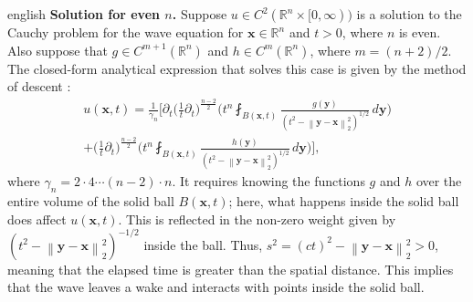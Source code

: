 \documentclass[12pt,letterpaper,twoside]{book}
\newcommand{\norm}[1]{\left\lVert #1 \right\rVert}
\begin{document}
\begin{hyphenrules}{english}
\textbf{Solution for even $n$.}
Suppose $u\in C^2(\mathbb{R}^n\times[0,\infty))$ is a solution to the Cauchy problem for the wave equation for
$\mathbf{x}\in\mathbb{R}^n$ and $t>0$, where $n$ is even. Also suppose that $g\in C^{m+1}(\mathbb{R}^n)$ and $h\in C^m(\mathbb{R}^n)$,
where $m=(n+2)/2$. The closed-form analytical expression that solves this case is given by the method
of descent \cite{evans2010}:
\begin{multline}
  u(\mathbf{x},t)=\frac{1}{\gamma_n}\Bigg[\partial_t\Big(\frac1t\partial_t\Big)^{\frac{n-2}{2}}
    \Big(t^{n}\fint_{B(\mathbf{x},t)}\frac{g(\mathbf{y})}{(t^2-\norm{\mathbf{y}-\mathbf{x}}_2^2)^{1/2}}\,d\mathbf{y}\Big)\\
    +\Big(\frac1t\partial_t\Big)^{\frac{n-2}{2}}
    \Big(t^{n}\fint_{B(\mathbf{x},t)}\frac{h(\mathbf{y})}{(t^2-\norm{\mathbf{y}-\mathbf{x}}_2^2)^{1/2}}\,d\mathbf{y}\Big)\Bigg],
  \label{eq:wave-even}
\end{multline}
where $\gamma_n=2\cdot4\cdots(n-2)\cdot n$. It requires knowing the functions $g$ and $h$ over the
entire volume of the solid ball $B(\mathbf{x},t)$; here, what happens inside the solid ball does affect
$u(\mathbf{x},t)$. This is reflected in the non-zero weight given by $(t^2-\norm{\mathbf{y}-\mathbf{x}}_2^2)^{-1/2}$ inside the
ball. Thus, $s^2=(ct)^2-\norm{\mathbf{y}-\mathbf{x}}_2^2>0$, meaning that the elapsed time is greater than the spatial
distance. This implies that the wave leaves a wake and interacts with points inside the solid ball.


\end{hyphenrules}
\end{document}
